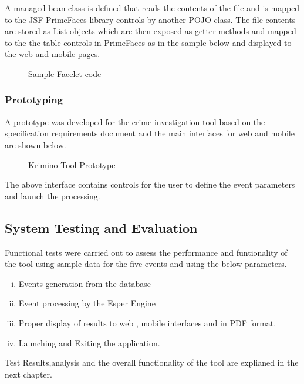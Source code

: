 \noindent A managed bean class is defined that reads the contents of the file and is mapped to the JSF PrimeFaces library controls by another POJO class. The file contents are stored as List objects which are then exposed as getter methods and mapped to the the table controls in PrimeFaces as in the sample below and displayed to the web and mobile pages.

\begin{center}
\begin{figure}[h]
\caption{Sample Facelet code}

\end{figure}
\end{center}

\subsubsection{Prototyping}

\noindent A prototype was developed for the crime investigation tool based on the specification requirements document and the main interfaces for web and mobile are shown below.


\begin{center}
\begin{figure}[h]
\caption{Krimino Tool Prototype}

\end{figure}
\end{center}

\noindent The above interface contains controls for the user to define the event parameters and launch the processing.

\subsection{System Testing and Evaluation}

\noindent Functional tests were carried out to assess the performance and funtionality of the tool using sample data for the five events and using the below parameters.

\begin{enumerate}[(i)]
\item Events generation from the database
\item Event processing by the Esper Engine
\item Proper display of results to web , mobile interfaces and in PDF format.
\item Launching and Exiting the application.
 \end{enumerate}

\noindent Test Results,analysis and the overall functionality of the tool are explianed in the next chapter.




